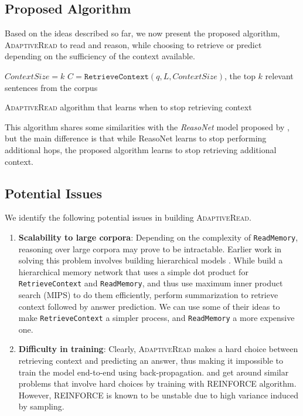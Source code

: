 \subsection{Proposed Algorithm}
Based on the ideas described so far, we now present the proposed algorithm, \textsc{AdaptiveRead}
to read and reason, while choosing to retrieve or predict depending on the sufficiency
of the context available.

\begin{algorithm}[H]
 $ContextSize = k$ \;
 $C = \texttt{RetrieveContext}(q, L, ContextSize)$, the top $k$ relevant sentences from the corpus\;
  {
 }
 \caption{\textsc{AdaptiveRead} algorithm that learns when to stop retrieving context}
\end{algorithm}

This algorithm shares some similarities with the \textit{ReasoNet} model
proposed by \cite{shen2016reasonet}, but the main difference is that while ReasoNet learns to
stop performing additional hops, the proposed algorithm learns to stop retrieving additional context.

\subsection{Potential Issues}
We identify the following potential issues in building \textsc{AdaptiveRead}.
\begin{enumerate}
 \item \textbf{Scalability to large corpora}: Depending on the complexity of \texttt{ReadMemory}, reasoning
 over large corpora may prove to be intractable. Earlier work in solving this problem involves building
 hierarchical models \citep{chandar2016hierarchical,choi2016hierarchical}. While \cite{chandar2016hierarchical}
 build a hierarchical memory network that uses a simple dot product for \texttt{RetrieveContext} and \texttt{ReadMemory},
 and thus use maximum inner product search (MIPS) to do them efficiently, \cite{choi2016hierarchical} perform summarization
 to retrieve context followed by answer prediction. We can use some of their ideas to make \texttt{RetrieveContext} a simpler
 process, and \texttt{ReadMemory} a more expensive one.
 
 \item \textbf{Difficulty in training}: Clearly, \textsc{AdaptiveRead} makes a hard choice between retrieving context and
 predicting an answer, thus making it impossible to train the model end-to-end using back-propagation. \cite{shen2016reasonet}
 and \cite{choi2016hierarchical} get around similar problems that involve hard choices by training with 
 REINFORCE \citep{williams1992simple} algorithm. However, REINFORCE is known to be unstable due to high variance induced by
 sampling.
\end{enumerate}


